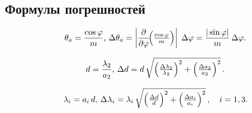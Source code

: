 \subsection*{Формулы погрешностей}

\[
	\theta_a = \frac{\cos\varphi}{m}\text{, }
	\Delta\theta_a
	= \left|\frac{\partial}{\partial\varphi}\!\Bigl(\tfrac{\cos\varphi}{m}\Bigr)\right|\;\Delta\varphi
	= \frac{|\sin\varphi|}{m}\,\Delta\varphi.
\]

\[
	d = \frac{\lambda_2}{a_2}\text{, }
	\Delta d
	= d\,\sqrt{\Bigl(\tfrac{\Delta\lambda_2}{\lambda_2}\Bigr)^2
		+\Bigl(\tfrac{\Delta a_2}{a_2}\Bigr)^2}\,.
\]

\[
	\lambda_i = a_i\,d\text{, }
	\Delta\lambda_i
	= \lambda_i\,\sqrt{\Bigl(\tfrac{\Delta d}{d}\Bigr)^2
		+\Bigl(\tfrac{\Delta a_i}{a_i}\Bigr)^2}\,,
	\quad i = 1,3.
\]
